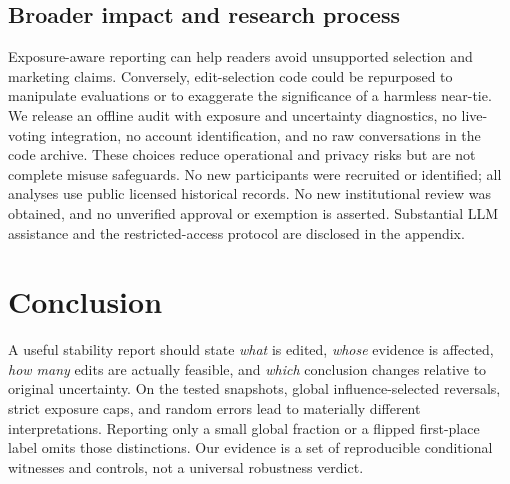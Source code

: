 \documentclass{article}
\begin{document}
\subsection{Broader impact and research process}\label{sec:impact}
Exposure-aware reporting can help readers avoid unsupported selection and marketing claims. Conversely, edit-selection code could be repurposed to manipulate evaluations or to exaggerate the significance of a harmless near-tie. We release an offline audit with exposure and uncertainty diagnostics, no live-voting integration, no account identification, and no raw conversations in the code archive. These choices reduce operational and privacy risks but are not complete misuse safeguards. No new participants were recruited or identified; all analyses use public licensed historical records. No new institutional review was obtained, and no unverified approval or exemption is asserted. Substantial LLM assistance and the restricted-access protocol are disclosed in the appendix.

\section{Conclusion}
A useful stability report should state \emph{what} is edited, \emph{whose} evidence is affected, \emph{how many} edits are actually feasible, and \emph{which} conclusion changes relative to original uncertainty. On the tested snapshots, global influence-selected reversals, strict exposure caps, and random errors lead to materially different interpretations. Reporting only a small global fraction or a flipped first-place label omits those distinctions. Our evidence is a set of reproducible conditional witnesses and controls, not a universal robustness verdict.

\label{maintextend}
\clearpage


\clearpage
\appendix

\clearpage

\end{document}
